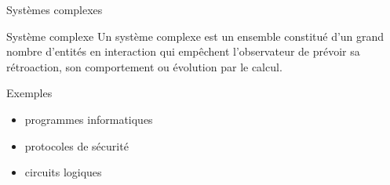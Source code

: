 \begin{frame}{Systèmes complexes}
  \begin{block}{Système complexe}
    Un système complexe est un ensemble constitué d'un grand nombre d'entités en interaction qui empêchent l'observateur de prévoir sa rétroaction, son comportement ou évolution par le calcul.
  \end{block}
  \pause
  \begin{exampleblock}{Exemples}
    \begin{itemize}
    \item programmes informatiques
    \item protocoles de sécurité
    \item circuits logiques
    \end{itemize}
  \end{exampleblock}
\end{frame}

